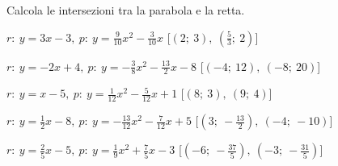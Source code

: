 \begin{esercizio}\label{ese:}
 Calcola le intersezioni tra la parabola e la retta.
 \begin{enumeratea}
  \item  $r:~y = 3 x -3,~p:~y=\frac{9}{10} x^2 -\frac{3}{10} x $
   \hfill [$\left (2;~3 \right ),~\left (\frac{5}{3};~2 \right )$]
  \item  $r:~y = -2 x +4,~p:~y=-\frac{3}{8} x^2 -\frac{13}{2} x -8$
   \hfill [$\left (-4;~12 \right ),~\left (-8;~20 \right )$]
  \item  $r:~y = x -5,~p:~y=\frac{1}{12} x^2 -\frac{5}{12} x +1$
   \hfill [$\left (8;~3 \right ),~\left (9;~4 \right )$]
  \item  $r:~y = \frac{1}{2} x -8,~p:~y=-\frac{13}{12} x^2 -\frac{7}{12} x +5$
   \hfill [$\left (3;~-\frac{13}{2} \right ),~\left (-4;~-10 \right )$]
  \item  $r:~y = \frac{2}{5} x -5,~p:~y=\frac{1}{9} x^2 +\frac{7}{5} x -3$
   \hfill [$\left (-6;~-\frac{37}{5} \right ),~\left (-3;~-\frac{31}{5} \right )$]

\end{enumeratea}
\end{esercizio}

